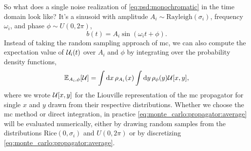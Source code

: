 So what does a single noise realization of \cref{eq:psd:monochromatic} in the time domain look like? 
It's a sinusoid with amplitude $A_i \sim \text{Rayleigh}(\sigma_i)$,
frequency $\omega_i$, and phase $\phi \sim U(0, 2\pi)$,
\begin{equation}\label{eq:monte_carlo:noise_trace}
    b(t) = A_i\sin(\omega_i t + \phi).
\end{equation}
Instead of taking the random sampling approach of \gls{mc}, we can also compute the expectation value of $\mathcal{U}_i(t)$ over $A_i$ and $\phi$ by integrating over the probability density functions,
\begin{equation}
    \label{eq:monte_carlo:propagator:average}
    \mathbb{E}_{A_i,\phi}[\mathcal{U}] = \int\dd{x}\rho_{A_i}(x)\int\dd{y}\rho_{\phi}(y)\mathcal{U}[x, y],
\end{equation}
where we wrote $\mathcal{U}[x, y]$ for the Liouville representation of the \gls{mc} propagator for single $x$ and $y$ drawn from their respective distributions.
Whether we choose the \gls{mc} method or direct integration, in practice \cref{eq:monte_carlo:propagator:average} will be evaluated numerically, either by drawing random samples from the distributions $\text{Rice}(0, \sigma_i)$ and $U(0,2\pi)$ or by discretizing \cref{eq:monte_carlo:propagator:average}.

